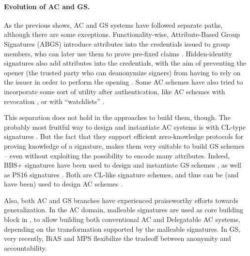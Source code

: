 \paragraph{Evolution of AC and GS.} %
As the previous shows, AC and GS systems have followed separate paths, although
there are some exceptions. Functionality-wise, Attribute-Based Group Signatures
(ABGS) introduce attributes into the credentials issued to group members, who
can later use them to prove pre-fixed claims \cite{emo09,aa14}. Hidden-identity
signatures also add attributes into the credentials, with the aim of preventing
the opener (the trusted party who can deanonymize signers) from having to rely
on the issuer in order to perform the opening \cite{ks07}. Some AC schemes have
also tried to incorporate some sort of utility after authentication, like AC
schemes with revocation \cite{cks10}, or with ``watchlists'' \needcite.

This separation does not hold in the approaches to build them, though. The
probably most fruitful way to design and instantiate AC systems
is with CL-type signatures \cite{cl02}. But the fact that they support efficient
zero-knowledge protocols for proving knowledge of a signature, makes them very
suitable to build GS schemes -- even without exploiting the possibility to
encode many attributes. Indeed, BBS+ signatures \cite{bbs04,cdl16b} have been
used to design and instantiate GS schemes \cite{gl19,dl21}, as well as  PS16
signatures \cite{ps16,cdl+20}. Both are CL-like signature schemes, and thus
can be (and have been) used to design AC schemes \needcite.

Also, both AC and GS branches have experienced praiseworthy efforts towards
generalization. In the AC domain, malleable signatures are used as core building
block in \cite{cklm14}, to allow building both conventional AC and Delegatable
AC systems, depending on the transformation supported by the malleable
signatures. In GS, very recently, BiAS \cite{lnpy21} and MPS \needcite
flexibilize the tradeoff between anonymity and accountability.


